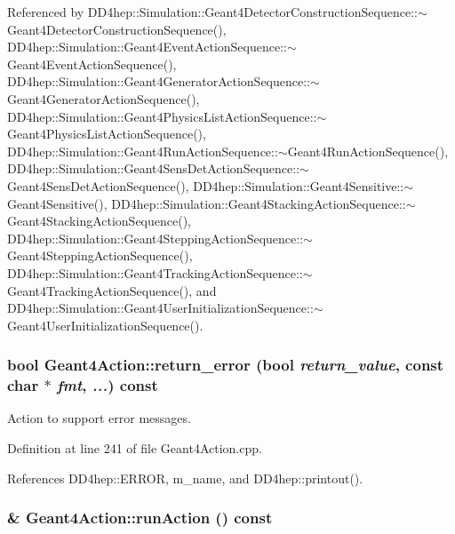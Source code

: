 Referenced by DD4hep::Simulation::Geant4DetectorConstructionSequence::$\sim$Geant4DetectorConstructionSequence(), DD4hep::Simulation::Geant4EventActionSequence::$\sim$Geant4EventActionSequence(), DD4hep::Simulation::Geant4GeneratorActionSequence::$\sim$Geant4GeneratorActionSequence(), DD4hep::Simulation::Geant4PhysicsListActionSequence::$\sim$Geant4PhysicsListActionSequence(), DD4hep::Simulation::Geant4RunActionSequence::$\sim$Geant4RunActionSequence(), DD4hep::Simulation::Geant4SensDetActionSequence::$\sim$Geant4SensDetActionSequence(), DD4hep::Simulation::Geant4Sensitive::$\sim$Geant4Sensitive(), DD4hep::Simulation::Geant4StackingActionSequence::$\sim$Geant4StackingActionSequence(), DD4hep::Simulation::Geant4SteppingActionSequence::$\sim$Geant4SteppingActionSequence(), DD4hep::Simulation::Geant4TrackingActionSequence::$\sim$Geant4TrackingActionSequence(), and DD4hep::Simulation::Geant4UserInitializationSequence::$\sim$Geant4UserInitializationSequence().\hypertarget{class_d_d4hep_1_1_simulation_1_1_geant4_action_a3cdefc7063e8ca7d7fe55ebb7487daab}{
\subsubsection[{return\_\-error}]{\setlength{\rightskip}{0pt plus 5cm}bool Geant4Action::return\_\-error (bool {\em return\_\-value}, \/  const char $\ast$ {\em fmt}, \/   {\em ...}) const}}
\label{class_d_d4hep_1_1_simulation_1_1_geant4_action_a3cdefc7063e8ca7d7fe55ebb7487daab}


Action to support error messages. 

Definition at line 241 of file Geant4Action.cpp.

References DD4hep::ERROR, m\_\-name, and DD4hep::printout().\hypertarget{class_d_d4hep_1_1_simulation_1_1_geant4_action_a242b367d623151c0cd3a892915f371b9}{
\subsubsection[{runAction}]{ \& Geant4Action::runAction () const}}
\label{class_d_d4hep_1_1_simulation_1_1_geant4_action_a242b367d623151c0cd3a892915f371b9}


